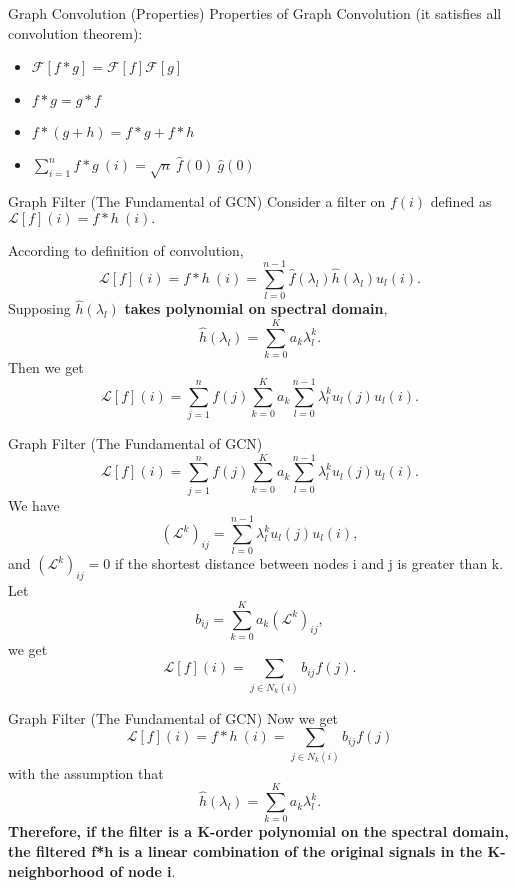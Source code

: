 \documentclass{beamer}
\begin{document}
	\begin{frame}{Graph Convolution (Properties)}
		Properties of Graph Convolution (it satisfies all convolution theorem):
		\begin{itemize}
			\item $\mathcal{F}[f*g] = \mathcal{F}[f]\mathcal{F}[g]$
			\item $f*g=g*f$
			\item $f*(g+h) = f*g + f*h$
			\item $\sum_{i=1}^{n}f*g\ (i) = \sqrt{n}\ \hat{f}(0)\ \hat{g}(0)$
		\end{itemize}
	\end{frame}
	\begin{frame}{Graph Filter (The Fundamental of GCN)}
		Consider a filter on $f(i)$ defined as $\mathcal{L}[f](i)=f*h\ (i).$
		
		According to definition of convolution,
		\[
		\mathcal{L}[f](i)=f*h\ (i)=\sum_{l=0}^{n-1}\hat{f}(\lambda_l)\hat{h}(\lambda_l)u_l(i).
		\]
		Supposing $\hat{h}(\lambda_l)$ \textbf{takes polynomial on spectral domain},
		\[
		\hat{h}(\lambda_l) = \sum_{k=0}^{K}a_k\lambda_l^k.
		\]
		Then we get
		\[
		\mathcal{L}[f](i) = \sum_{j=1}^{n}f(j)\sum_{k=0}^{K}a_k\sum_{l=0}^{n-1}\lambda_l^ku_l(j)u_l(i).
		\]
	\end{frame}
	\begin{frame}{Graph Filter (The Fundamental of GCN)}
		\[
		\mathcal{L}[f](i) = \sum_{j=1}^{n}f(j)\sum_{k=0}^{K}a_k\sum_{l=0}^{n-1}\lambda_l^ku_l(j)u_l(i).
		\]
		We have
		\[
		(\mathcal{L}^k)_{ij} = \sum_{l=0}^{n-1}\lambda_l^ku_l(j)u_l(i),
		\]
		and $(\mathcal{L}^k)_{ij}=0$ if the shortest distance between nodes i and j is greater than k.
		Let
		\[
		b_{ij} = \sum_{k=0}^{K}a_k(\mathcal{L}^k)_{ij},
		\]
		we get
		\[
		\mathcal{L}[f](i) = \sum_{j \in N_k(i)} b_{ij}f(j).
		\]
	\end{frame}
	\begin{frame}{Graph Filter (The Fundamental of GCN)}
		Now we get
		\[
		\mathcal{L}[f](i)=f*h\ (i)=\sum_{j \in N_k(i)} b_{ij}f(j)
		\]
		with the assumption that
		\[
		\hat{h}(\lambda_l) = \sum_{k=0}^{K}a_k\lambda_l^k.
		\]
		\textbf{Therefore, if the filter is a K-order polynomial on the spectral domain, the filtered f*h is a linear combination of the original signals in the K-neighborhood of node i}.
	\end{frame}
\end{document}
